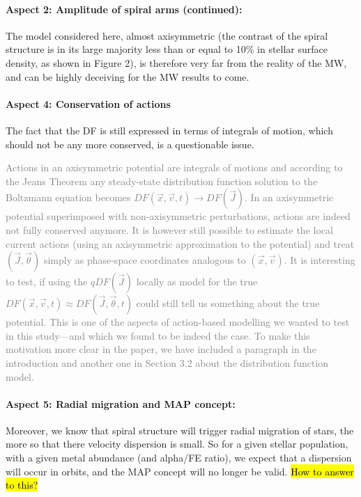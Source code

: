 \documentclass[10pt,a4paper]{article}
\newcommand{\Answer}[1]{\textcolor{Gray}{#1}}
\begin{document}
\paragraph{Aspect 2: Amplitude of spiral arms (continued):} The model considered here, almost axisymmetric (the contrast of the spiral structure is in its large majority less than or equal to 10\% in stellar surface density, as shown in Figure 2),  is therefore very far from the reality of the MW, and can be highly deceiving for the MW results to come.

\Answer{}

\paragraph{Aspect 4: Conservation of actions} The fact that the DF is still expressed in terms of integrals of motion, which should not be any more conserved, is a questionable issue.

\Answer{Actions in an axisymmetric potential are integrals of motions and according to the Jeans Theorem any steady-state distribution function solution to the Boltzmann equation becomes $DF(\vec{x},\vec{v},t) \longrightarrow DF(\vec{J})$. In an axisymmetric potential superimposed with non-axisymmetric perturbations, actions are indeed not fully conserved anymore. It is however still possible to estimate the local current actions (using an axisymmetric approximation to the potential) and treat $(\vec{J},\vec{\theta})$ simply as phase-space coordinates analogous to $(\vec{x},\vec{v})$. It is interesting to test, if using the $qDF(\vec{J})$ locally as model for the true $DF(\vec{x},\vec{v},t)\approx DF(\vec{J},\vec{\theta},t)$ could still tell us something about the true potential. This is one of the aspects of action-based modelling we wanted to test in this study---and which we found to be indeed the case. To make this motivation more clear in the paper, we have included a paragraph in the introduction and another one in Section 3.2 about the distribution function model.}

\paragraph{Aspect 5: Radial migration and MAP concept:} Moreover, we know that spiral structure will trigger radial migration of stars, the
more so that there velocity dispersion is small. So for a given stellar population,
with a given metal abundance (and alpha/FE ratio), we expect that a dispersion will
occur in orbits, and the MAP concept will no longer be valid. \hl{How to answer to this?}
\end{document}
